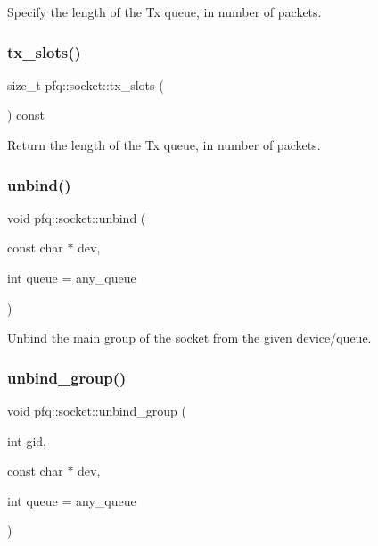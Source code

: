 Specify the length of the Tx queue, in number of packets. 

\mbox{\label{classpfq_1_1socket_a99c77a5c33e925f47f47c51b384e4fda}} 
\subsubsection{\texorpdfstring{tx\+\_\+slots()}{tx\_slots()}\hspace{0.1cm}{\footnotesize\ttfamily [2/2]}}
{\footnotesize\ttfamily size\+\_\+t pfq\+::socket\+::tx\+\_\+slots (\begin{DoxyParamCaption}{ }\end{DoxyParamCaption}) const\hspace{0.3cm}{\ttfamily [inline]}}



Return the length of the Tx queue, in number of packets. 

\mbox{\label{classpfq_1_1socket_af53d407f46ba2b4d143782ff7d585758}} 
\subsubsection{\texorpdfstring{unbind()}{unbind()}}
{\footnotesize\ttfamily void pfq\+::socket\+::unbind (\begin{DoxyParamCaption}\item[{const char $\ast$}]{dev,  }\item[{int}]{queue = {\ttfamily any\+\_\+queue} }\end{DoxyParamCaption})\hspace{0.3cm}{\ttfamily [inline]}}



Unbind the main group of the socket from the given device/queue. 

\mbox{\label{classpfq_1_1socket_a6e1f7ee7f44b6824d734d4ff7046d907}} 
\subsubsection{\texorpdfstring{unbind\+\_\+group()}{unbind\_group()}}
{\footnotesize\ttfamily void pfq\+::socket\+::unbind\+\_\+group (\begin{DoxyParamCaption}\item[{int}]{gid,  }\item[{const char $\ast$}]{dev,  }\item[{int}]{queue = {\ttfamily any\+\_\+queue} }\end{DoxyParamCaption})\hspace{0.3cm}{\ttfamily [inline]}}




